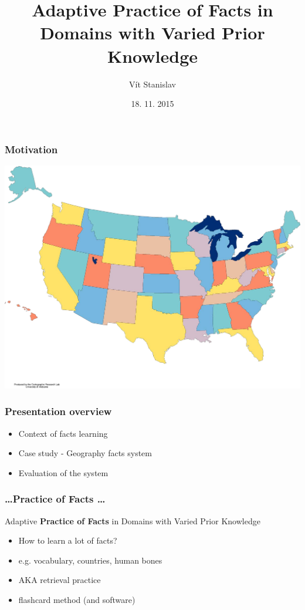 \documentclass[xcolor=svgnames]{beamer}
\title[Adaptive Practice of Facts with Varied Prior Knowledge]{Adaptive Practice of Facts in Domains with Varied Prior Knowledge}
\author{Vít Stanislav}
\institute{}      %
\date{18. 11. 2015}
\begin{document}
\frame[plain]{\titlepage}
\begin{frame}
	\frametitle{Motivation}
   \includegraphics[width=\textwidth]{img/usa.png}
\end{frame}
\begin{frame}
	\frametitle{Presentation overview}
	\begin{itemize}
    \item Context of facts learning
    \item Case study - Geography facts system
    \item Evaluation of the system
    \
	\end{itemize}
\end{frame}
\begin{frame}
	\frametitle{\ldots Practice of Facts \ldots}
   Adaptive \textbf{Practice of Facts} in Domains with Varied Prior Knowledge
	\begin{itemize}
    \item How to learn a lot of facts?
	  \item e.g. vocabulary, countries, human bones 
	  \item AKA retrieval practice
    \item flashcard method (and software)
    \
	\end{itemize}
\end{frame}
\end{document}
